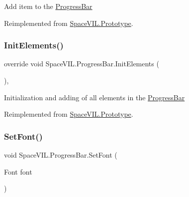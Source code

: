 Add item to the \mbox{\hyperlink{class_space_v_i_l_1_1_progress_bar}{Progress\+Bar}} 



Reimplemented from \mbox{\hyperlink{class_space_v_i_l_1_1_prototype}{Space\+V\+I\+L.\+Prototype}}.

\mbox{\label{class_space_v_i_l_1_1_progress_bar_a61f9a8602172eebf205ed6eee8cb3e30}} 
\subsubsection{\texorpdfstring{Init\+Elements()}{InitElements()}}
{\footnotesize\ttfamily override void Space\+V\+I\+L.\+Progress\+Bar.\+Init\+Elements (\begin{DoxyParamCaption}{ }\end{DoxyParamCaption})\hspace{0.3cm}{\ttfamily [inline]}, {\ttfamily [virtual]}}



Initialization and adding of all elements in the \mbox{\hyperlink{class_space_v_i_l_1_1_progress_bar}{Progress\+Bar}} 



Reimplemented from \mbox{\hyperlink{class_space_v_i_l_1_1_prototype_ac3379fe02923ee155b5b0084abf27420}{Space\+V\+I\+L.\+Prototype}}.

\mbox{\label{class_space_v_i_l_1_1_progress_bar_a97819041fe132c67cfca2b960d07a24c}} 
\subsubsection{\texorpdfstring{Set\+Font()}{SetFont()}}
{\footnotesize\ttfamily void Space\+V\+I\+L.\+Progress\+Bar.\+Set\+Font (\begin{DoxyParamCaption}\item[{Font}]{font }\end{DoxyParamCaption})\hspace{0.3cm}{\ttfamily [inline]}}



